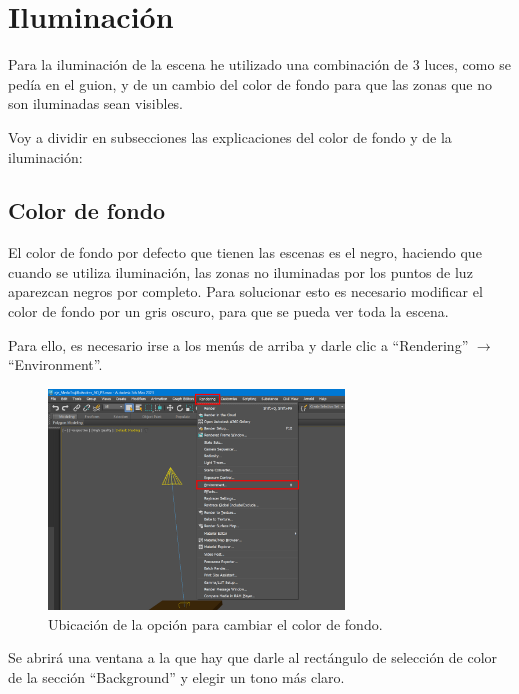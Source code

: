 \section{Iluminación}
Para la iluminación de la escena he utilizado una combinación de 3 luces, como se pedía en el guion, y de un cambio del color de fondo para que las zonas que no son iluminadas sean visibles.

\bigskip

Voy a dividir en subsecciones las explicaciones del color de fondo y de la iluminación:

\subsection{Color de fondo}

El color de fondo por defecto que tienen las escenas es el negro, haciendo que cuando se utiliza iluminación, las zonas no iluminadas por los puntos de luz aparezcan negros por completo. Para solucionar esto es necesario modificar el color de fondo por un gris oscuro, para que se pueda ver toda la escena.

\bigskip

Para ello, es necesario irse a los menús de arriba y darle clic a ``Rendering'' $\rightarrow$ ``Environment''.

\begin{figure}[H]
    \centering
    \includegraphics[width=0.7\textwidth]{imagenes/misc/bg-color1.png}
    \caption{Ubicación de la opción para cambiar el color de fondo.}
 \end{figure}

Se abrirá una ventana a la que hay que darle al rectángulo de selección de color de la sección ``Background'' y elegir un tono más claro.

